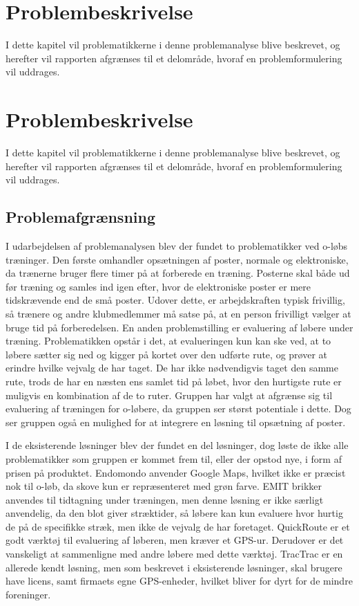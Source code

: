 \chapter{Problembeskrivelse}
I dette kapitel vil problematikkerne i denne problemanalyse blive beskrevet, og herefter vil rapporten afgrænses til et delområde, hvoraf en problemformulering vil uddrages.

\chapter{Problembeskrivelse}
I dette kapitel vil problematikkerne i denne problemanalyse blive beskrevet, og herefter vil rapporten afgrænses til et delområde, hvoraf en problemformulering vil uddrages.

\section{Problemafgrænsning}
I udarbejdelsen af problemanalysen blev der fundet to problematikker ved o-løbs træninger. Den første omhandler opsætningen af poster, normale og elektroniske, da trænerne bruger flere timer på at forberede en træning. Posterne skal både ud før træning og samles ind igen efter, hvor de elektroniske poster er mere tidskrævende end de små poster. Udover dette, er arbejdskraften typisk frivillig, så trænere og andre klubmedlemmer må satse på, at en person frivilligt vælger at bruge tid på forberedelsen. En anden problemstilling er evaluering af løbere under træning. Problematikken opstår i det, at evalueringen kun kan ske ved, at to løbere sætter sig ned og kigger på kortet over den udførte rute, og prøver at erindre hvilke vejvalg de har taget. De har ikke nødvendigvis taget den samme rute, trods de har en næsten ens samlet tid på løbet, hvor den hurtigste rute er muligvis en kombination af de to ruter. Gruppen har valgt at afgrænse sig til evaluering af træningen for o-løbere, da gruppen ser størst potentiale i dette. Dog ser gruppen også en mulighed for at integrere en løsning til opsætning af poster.

I de eksisterende løsninger blev der fundet en del løsninger, dog løste de ikke alle problematikker som gruppen er kommet frem til, eller der opstod nye, i form af prisen på produktet.
Endomondo anvender Google Maps, hvilket ikke er præcist nok til o-løb, da skove kun er repræsenteret med grøn farve. EMIT brikker anvendes til tidtagning under træningen, men denne løsning er ikke særligt anvendelig, da den blot giver stræktider, så løbere kan kun evaluere hvor hurtig de på de specifikke stræk, men ikke de vejvalg de har foretaget. QuickRoute er et godt værktøj til evaluering af løberen, men kræver et GPS-ur. Derudover er det vanskeligt at sammenligne med andre løbere med dette værktøj.
TracTrac er en allerede kendt løsning, men som beskrevet i eksisterende løsninger, skal brugere have licens, samt firmaets egne GPS-enheder, hvilket bliver for dyrt for de mindre foreninger.


